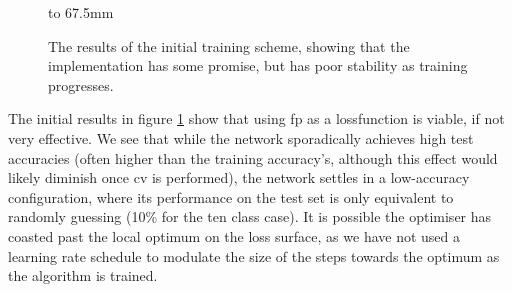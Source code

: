 \begin{figure}[p]
    \hbox to 67.5mm{}%
    \caption[The results of the initial training scheme.]{The results of the initial training scheme, showing that the implementation has some promise, but has poor stability as training progresses.}
    \label{fig:training_scheme_1}
\end{figure}

The initial results in figure \ref{fig:training_scheme_1} show that using \gls{fp} as a \gls{lossfunction} is viable, if not very effective. We see that while the network sporadically achieves high test accuracies (often higher than the training accuracy's, although this effect would likely diminish once \gls{cv} is performed), the network settles in a low-accuracy configuration, where its performance on the test set is only equivalent to randomly guessing (10\% for the ten class case). It is possible the optimiser has coasted past the local optimum on the loss surface, as we have not used a learning rate schedule to modulate the size of the steps towards the optimum as the algorithm is trained.
\bigskip

